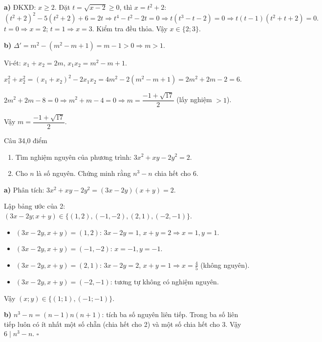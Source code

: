 \begin{loi_giai_cau}
\textbf{a)} ĐKXĐ: $x \ge 2$. Đặt $t=\sqrt{x-2}\ge0$, thì $x=t^2+2$:
\[(t^2+2)^2-5(t^2+2)+6=2t \Rightarrow t^4-t^2-2t=0 \Rightarrow t(t^3-t-2)=0 \Rightarrow t(t-1)(t^2+t+2)=0.\]
$t=0 \Rightarrow x=2$; $t=1 \Rightarrow x=3$. Kiểm tra đều thỏa. Vậy $\boxed{x\in\{2;3\}}$.

\textbf{b)} $\Delta'=m^2-(m^2-m+1)=m-1>0 \Rightarrow m>1$.

Vi-ét: $x_1+x_2=2m$, $x_1x_2=m^2-m+1$.

$x_1^2+x_2^2=(x_1+x_2)^2-2x_1x_2=4m^2-2(m^2-m+1)=2m^2+2m-2=6$.

$2m^2+2m-8=0 \Rightarrow m^2+m-4=0 \Rightarrow m=\dfrac{-1+\sqrt{17}}{2}$ (lấy nghiệm $>1$).

Vậy $\boxed{m=\dfrac{-1+\sqrt{17}}{2}}$.
\end{loi_giai_cau}

\begin{de_cau}{Câu 3}{4,0 điểm}
\begin{enumerate}[label=\alph*)]
  \item Tìm nghiệm nguyên của phương trình: $3x^2 + xy - 2y^2 = 2$.
  \item Cho $n$ là số nguyên. Chứng minh rằng $n^3 - n$ chia hết cho $6$.
\end{enumerate}
\end{de_cau}

\begin{loi_giai_cau}
\textbf{a)} Phân tích: $3x^2+xy-2y^2=(3x-2y)(x+y)=2$.

Lập bảng ước của 2: $(3x-2y;x+y)\in\{(1,2),(-1,-2),(2,1),(-2,-1)\}$.

\begin{itemize}
  \item $(3x-2y,x+y)=(1,2)$: $3x-2y=1$, $x+y=2 \Rightarrow x=1,y=1$.
  \item $(3x-2y,x+y)=(-1,-2)$: $x=-1,y=-1$.
  \item $(3x-2y,x+y)=(2,1)$: $3x-2y=2$, $x+y=1 \Rightarrow x=\frac{4}{5}$ (không nguyên).
  \item $(3x-2y,x+y)=(-2,-1)$: tương tự không có nghiệm nguyên.
\end{itemize}
Vậy $(x;y)\in\{(1;1),(-1;-1)\}$.

\textbf{b)} $n^3-n=(n-1)n(n+1)$: tích ba số nguyên liên tiếp. Trong ba số liên tiếp luôn có ít nhất một số chẵn (chia hết cho 2) và một số chia hết cho 3. Vậy $6 \mid n^3-n$. $\square$
\end{loi_giai_cau}

